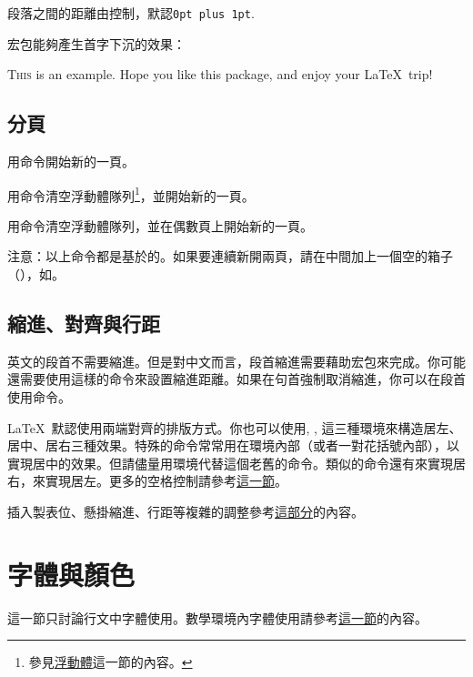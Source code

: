 段落之間的距離由控制，默認\texttt{0pt plus 1pt}. 
\begin{latex}
\setlength{\parskip}{0pt}
\end{latex}

宏包能夠產生首字下沉的效果：
\begin{codeshow}
\lettrine{T}{his} is an example. Hope you like this package, and enjoy your \LaTeX\ trip!
\end{codeshow}

\subsection{分頁}
用命令開始新的一頁。

用命令清空浮動體隊列\footnote{參見\hyperref[sec:float]{浮動體}這一節的內容。}，並開始新的一頁。

用命令清空浮動體隊列，並在偶數頁上開始新的一頁。

注意：以上命令都是基於的。如果要連續新開兩頁，請在中間加上一個空的箱子（），如。

\subsection{縮進、對齊與行距}
英文的段首不需要縮進。但是對中文而言，段首縮進需要藉助宏包來完成。你可能還需要使用這樣的命令來設置縮進距離。如果在句首強制取消縮進，你可以在段首使用命令。

\LaTeX\ 默認使用兩端對齊的排版方式。你也可以使用, , 這三種環境來構造居左、居中、居右三種效果。特殊的命令常常用在環境內部（或者一對花括號內部），以實現居中的效果。但請儘量用環境代替這個老舊的命令。類似的命令還有來實現居右，來實現居左。更多的空格控制請參考\hyperref[sec:hvspace]{這一節}。

插入製表位、懸掛縮進、行距等複雜的調整參考\hyperref[sec:hvspace]{這部分}的內容。

\section{字體與顏色}
\label{sec:font}
這一節只討論行文中字體使用。數學環境內字體使用請參考\hyperref[sec:mathfont]{這一節}的內容。

